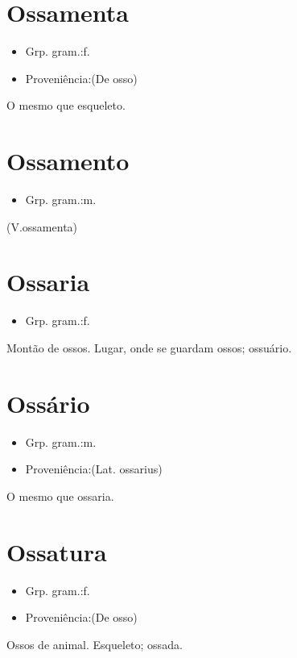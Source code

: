 \section{Ossamenta}
\begin{itemize}
\item {Grp. gram.:f.}
\end{itemize}
\begin{itemize}
\item {Proveniência:(De \textunderscore osso\textunderscore )}
\end{itemize}
O mesmo que \textunderscore esqueleto\textunderscore .
\section{Ossamento}
\begin{itemize}
\item {Grp. gram.:m.}
\end{itemize}
(V.ossamenta)
\section{Ossaria}
\begin{itemize}
\item {Grp. gram.:f.}
\end{itemize}
Montão de ossos.
Lugar, onde se guardam ossos; ossuário.
\section{Ossário}
\begin{itemize}
\item {Grp. gram.:m.}
\end{itemize}
\begin{itemize}
\item {Proveniência:(Lat. \textunderscore ossarius\textunderscore )}
\end{itemize}
O mesmo que \textunderscore ossaria\textunderscore .
\section{Ossatura}
\begin{itemize}
\item {Grp. gram.:f.}
\end{itemize}
\begin{itemize}
\item {Proveniência:(De \textunderscore osso\textunderscore )}
\end{itemize}
Ossos de animal.
Esqueleto; ossada.

